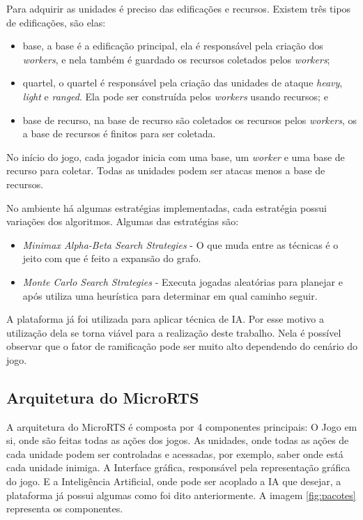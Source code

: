 Para adquirir as unidades é preciso das edificações e recursos. Existem três tipos de edificações, são elas:

\begin{itemize}
	\item base, a base é a edificação principal, ela é responsável pela criação dos \textit{workers}, e nela também é guardado os recursos coletados pelos \textit{workers};
	\item quartel, o quartel é responsável pela criação das unidades de ataque \textit{heavy}, \textit{light} e \textit{ranged}. Ela pode ser construída pelos \textit{workers} usando recursos; e
	\item base de recurso, na base de recurso são coletados os recursos pelos \textit{workers}, os a base de recursos é finitos para ser coletada.
\end{itemize}  

No início do jogo, cada jogador inicia com uma base, um \textit{worker} e uma base de recurso para coletar. Todas as unidades podem ser atacas menos a base de recursos. 

No ambiente há algumas estratégias implementadas, cada estratégia possui variações dos algoritmos. Algumas das estratégias são:
\begin{itemize}
	\item \textit{Minimax Alpha-Beta Search Strategies} - O que muda entre as técnicas é o jeito com que é feito a expansão do grafo.
	\item \textit{Monte Carlo Search Strategies} - Executa jogadas aleatórias para planejar e após utiliza uma heurística para determinar em qual caminho seguir.
\end{itemize}

A plataforma já foi utilizada para aplicar técnica de IA. Por esse motivo a utilização dela se torna viável para a realização deste trabalho. 
Nela é possível observar que o fator de ramificação pode ser muito alto dependendo do cenário do jogo.

\subsection{Arquitetura do MicroRTS}

A arquitetura do MicroRTS é composta por 4 componentes principais: O Jogo em si, onde são feitas todas as ações dos jogos. As unidades, onde todas as ações de cada unidade podem ser controladas e acessadas, por exemplo, saber onde está cada unidade inimiga. A Interface gráfica, responsável pela representação gráfica do jogo. E a Inteligência Artificial, onde pode ser acoplado a IA que desejar, a plataforma já possui algumas como foi dito anteriormente. A imagem \ref{fig:pacotes} representa os componentes.

